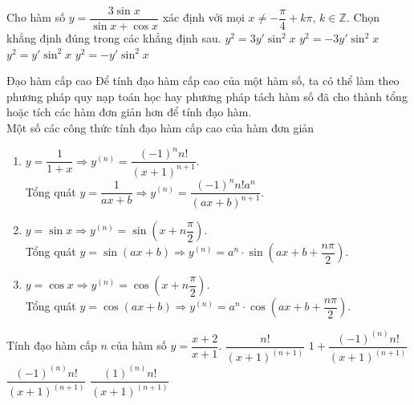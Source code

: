 \begin{vd}%
	Cho hàm số $y=\dfrac{3\sin x}{\sin x + \cos x}$ xác định với mọi $x \ne -\dfrac{\pi}{4} + k\pi$, $k \in \mathbb{Z}$. Chọn khẳng định đúng trong các khẳng định sau.
	\choice
	{\True $y^2=3y'\sin^2 x$}
	{$y^2=-3y'\sin^2 x$}
	{$y^2=y'\sin^2 x$}
	{$y^2=-y'\sin^2 x$}
\end{vd}

\begin{dang}{Đạo hàm cấp cao}
Để tính đạo hàm cấp cao của một hàm số, ta có thể làm theo phương pháp quy nạp toán học hay phương pháp tách hàm số đã cho thành tổng hoặc tích các hàm đơn giản hơn để tính đạo hàm.\\
Một số các công thức tính đạo hàm cấp cao của hàm đơn giản
\begin{enumerate}
	\item $y=\dfrac{1}{1+x}\Rightarrow y^{(n)}=\dfrac{(-1)^n n!}{(x+1)^{n+1}}$.\\
	Tổng quát $y=\dfrac{1}{ax+b}\Rightarrow y^{(n)}=\dfrac{(-1)^n n!a^n}{(ax+b)^{n+1}}$.
	\item $y=\sin x \Rightarrow  y^{(n)}=\sin(x+n\dfrac{\pi}{2})$.\\
	Tổng quát $y=\sin (ax+b) \Rightarrow y^{(n)}=a^n \cdot \sin \left(ax +b + \dfrac{n \pi}{2} \right).$
	\item $y=\cos x \Rightarrow y^{(n)}=\cos (x+n\dfrac{\pi}{2})$.\\
	Tổng quát $y=\cos (ax+b) \Rightarrow y^{(n)}=a^n \cdot \cos \left(ax +b + \dfrac{n \pi}{2} \right).$
\end{enumerate}
\end{dang}

\begin{vd}%
	Tính đạo hàm cấp $n$ của hàm số $y=\dfrac{x+2}{x+1}$.
	\choice
	{$\dfrac{n!}{(x+1)^{(n+1)}}$}
	{$1+\dfrac{(-1)^{(n)}n!}{(x+1)^{(n+1)}}$}
	{\True $\dfrac{(-1)^{(n)}n!}{(x+1)^{(n+1)}}$}
	{$\dfrac{(1)^{(n)}n!}{(x+1)^{(n+1)}}$}
	
\end{vd}

